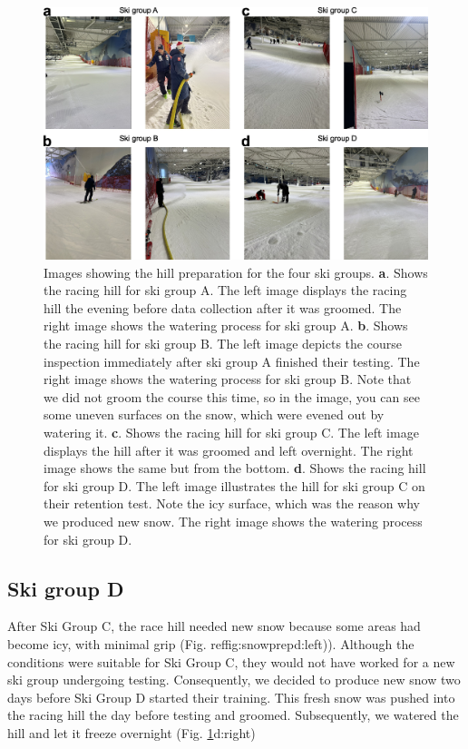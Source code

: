 \documentclass[pdflatex,sn-nature]{sn-jnl}%
\theoremstyle{thmstyleone}%
\theoremstyle{thmstyletwo}%
\theoremstyle{thmstylethree}%
\begin{document}
\begin{appendices}
\begin{figure}[H]
\centering
\includegraphics[width=\linewidth]{figures/figure_appendix_snowprep.jpg}
\caption{Images showing the hill preparation for the four ski groups. \textbf{a}. Shows the racing hill for ski group A. The left image displays the racing hill the evening before data collection after it was groomed. The right image shows the watering process for ski group A. \textbf{b}. Shows the racing hill for ski group B. The left image depicts the course inspection immediately after ski group A finished their testing. The right image shows the watering process for ski group B. Note that we did not groom the course this time, so in the image, you can see some uneven surfaces on the snow, which were evened out by watering it. \textbf{c}. Shows the racing hill for ski group C. The left image displays the hill after it was groomed and left overnight. The right image shows the same but from the bottom. \textbf{d}. Shows the racing hill for ski group D. The left image illustrates the hill for ski group C on their retention test. Note the icy surface, which was the reason why we produced new snow. The right image shows the watering process for ski group D. 
}
\label{fig:snowprep}
\end{figure}
 
\subsection*{Ski group D}
After Ski Group C, the race hill needed new snow because some areas had become icy, with minimal grip (Fig. ref{fig:snowprep}d:left)). Although the conditions were suitable for Ski Group C, they would not have worked for a new ski group undergoing testing. Consequently, we decided to produce new snow two days before Ski Group D started their training. This fresh snow was pushed into the racing hill the day before testing and groomed. Subsequently, we watered the hill and let it freeze overnight (Fig. \ref{fig:snowprep}d:right)




\end{appendices}
\end{document}

